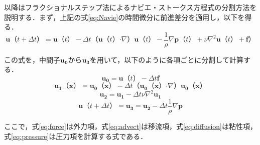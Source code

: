 \documentclass[a4j,12pt]{jreport}
\begin{document}
以降はフラクショナルステップ法によるナビエ・ストークス方程式の分割方法を説明する．まず，上記の式\ref{eq:Navie}の時間微分に前進差分を適用し，以下を得る．
\[
\bm{u} （t + \varDelta t） =   \bm{u} （t）-\varDelta t （\bm{u} （t）  \boldsymbol{\cdot}\nabla） \bm{u} （t）- \frac{1}{\rho}\nabla \bm{p}  （t）  + \nu\nabla^2\bm{u} （t）  + \bm{f}） 
\]

この式を，中間子$\bm{u_0}$から$\bm{u_3}$を用いて，以下のように各項ごとに分割して計算する．
\begin{equation}\label{eq:force}
	\bm{u_0} =  \bm{u} （t）  - \varDelta t \bm{f} 
\end{equation} 
\begin{equation}\label{eq:advect}
	\bm{u_1} （\bm{x}） = \bm{u_0} （\bm{x}） - \varDelta t （\bm{u_0}（\bm{x}）  \boldsymbol{\cdot}\nabla） \bm{u_0}（\bm{x}）
\end{equation}
\begin{equation}\label{eq:diffusion}
	\bm{u_2}   =  \bm{u_1} - \varDelta t \nu\nabla^2\bm{u_1}
\end{equation}
\begin{equation}\label{eq:pressure}
	\bm{u} （t + \varDelta t）= \bm{u_3}  =  \bm{u_2} - \varDelta t \frac{1}{\rho}\nabla \bm{p} 
\end{equation} 

ここで，式\ref{eq:force}は外力項，式\ref{eq:advect}は移流項，式\ref{eq:diffusion}は粘性項，式\ref{eq:pressure}は圧力項を計算する式である．


\end{document}
